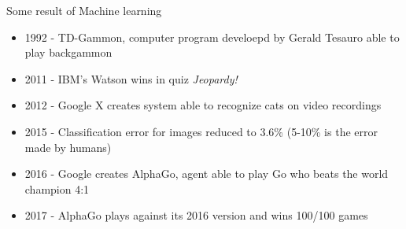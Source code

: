\documentclass[aspectratio=169]{beamer}
\begin{document}
\begin{frame}{Some result of Machine learning}
    \begin{itemize}
        \item 1992 - TD-Gammon, computer program develoepd by Gerald Tesauro able to play backgammon
        \item 2011 - IBM's Watson wins in quiz \textit{Jeopardy!}
        \item 2012 - Google X creates system able to recognize cats on video recordings
        \item 2015 - Classification error for images reduced to 3.6\% (5-10\% is the error made by humans)
        \item 2016 - Google creates AlphaGo, agent able to play Go who beats the world champion 4:1
        \item 2017 - AlphaGo plays against its 2016 version and wins 100/100 games
    \end{itemize}
\end{frame}
\end{document}
